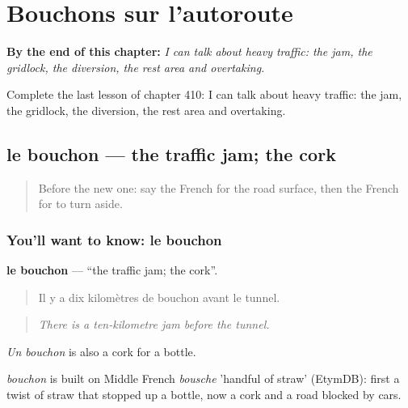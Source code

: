 
\chapter{Bouchons sur l'autoroute}
\label{ch:fr-bouchons-sur-l-autoroute}

\begin{chapteropening}
\textbf{By the end of this chapter:} \emph{I can talk about heavy traffic: the jam, the gridlock, the diversion, the rest area and overtaking.}

Complete the last lesson of chapter 410: I can talk about heavy traffic: the jam, the gridlock, the diversion, the rest area and overtaking.
\end{chapteropening}

\section[le bouchon]{le bouchon — the traffic jam; the cork}

\label{lesson:FR-C410-bouchon}



\begin{quote}
Before the new one: say the French for the road surface, then the French for to turn aside.
\end{quote}

\subsection*{You'll want to know: le bouchon}
\textbf{le bouchon} — \textquotedblleft{}the traffic jam; the cork\textquotedblright{}.

\begin{quote}
Il y a dix kilomètres de bouchon avant le tunnel.
\end{quote}

\begin{quote}
\emph{There is a ten-kilometre jam before the tunnel.}
\end{quote}

\emph{Un bouchon} is also a cork for a bottle.

\begin{cousinweb}
\emph{bouchon} is built on Middle French \emph{bousche} 'handful of straw' (EtymDB): first a twist of straw that stopped up a bottle, now a cork and a road blocked by cars.
\end{cousinweb}

